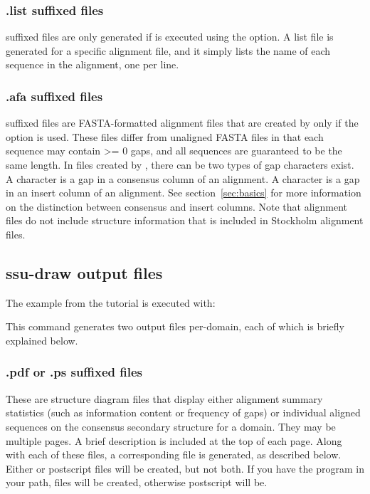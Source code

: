 \subsubsection{.list suffixed files}
 suffixed files are only generated if  is
executed using the  option. A list file is generated for
a specific alignment file, and it simply lists the name of each
sequence in the alignment, one per line.

\subsubsection{.afa suffixed files}
 suffixed files are FASTA-formatted alignment files that
are created by  only if the  option is
used. These files differ from unaligned FASTA files in that each
sequence may contain >= 0 gaps, and all sequences are guaranteed to be
the same length. In  files created by ,
there can be two types of gap characters exist. A \prog{-} character
is a gap in a consensus column of an alignment. A  character
is a gap in an insert column of an alignment. See
section~\ref{sec:basics} for more information on the distinction
between consensus and insert columns. Note that  alignment
files do not include structure information that is included in
Stockholm alignment files.

\subsection{ssu-draw output files}

The  example from the tutorial is executed with:


This command generates two output files per-domain, each of which is 
briefly explained below. 

\subsubsection{.pdf or .ps suffixed files}
These are structure diagram files that display either alignment
summary statistics (such as information content or frequency of gaps)
or individual aligned sequences on the consensus secondary structure
for a domain. They may be multiple pages. A brief description is
included at the top of each page. Along with each of these files, a
corresponding  file is generated, as described below.
Either  or postscript  files will
be created, but not both. If you have the program  in
your path,  files will be created, otherwise postscript
will be.

